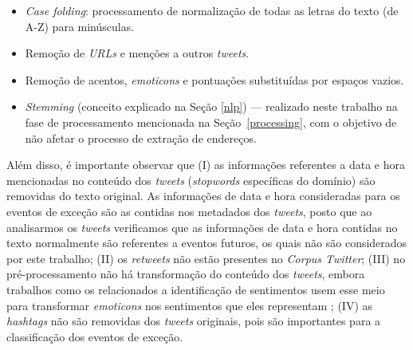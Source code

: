 \documentclass[
	12pt,				%
	oneside,			%
	a4paper,			%
	english,			%
	brazil				%
	]{abntex2ppgsi}
\begin{document}
{{\begin{itemize}
\item \textit{Case folding}: processamento de normalização de todas as letras do texto (de A-Z) para minúsculas.
\item Remoção de  \textit{URLs} e menções a outros \textit{tweets}.
\item Remoção de acentos, \textit{emoticons} e pontuações substituídas por espaços vazios.
\item \textit{Stemming} (conceito explicado na Seção \ref{nlp})  --- realizado neste trabalho na fase de processamento mencionada na Seção~\ref{processing}, com o objetivo de não afetar o processo de extração de endereços. 
\end{itemize}

Além disso, é importante observar que (I) as informações referentes a data e hora mencionadas no conteúdo dos \textit{tweets} (\textit{stopwords} específicas do domínio) são removidas do texto original. As informações de data e hora consideradas para os eventos de exceção são as contidas nos metadados dos \textit{tweets}, posto que ao analisarmos os \textit{tweets} verificamos que as informações de data e hora contidas no texto normalmente são referentes a eventos futuros, os quais não são considerados por este trabalho; (II) os \textit{retweets} não estão presentes no \textit{Corpus Twitter}; (III) no pré-processamento não há transformação do conteúdo dos \textit{tweets}, embora trabalhos como os relacionados a identificação de sentimentos usem esse meio para transformar \textit{emoticons} nos sentimentos que eles representam \cite{Zagal2016}; (IV) as \textit {hashtags} não são removidas dos \textit{tweets} originais, pois são importantes para a classificação dos eventos de exceção.

}}
\end{document}
